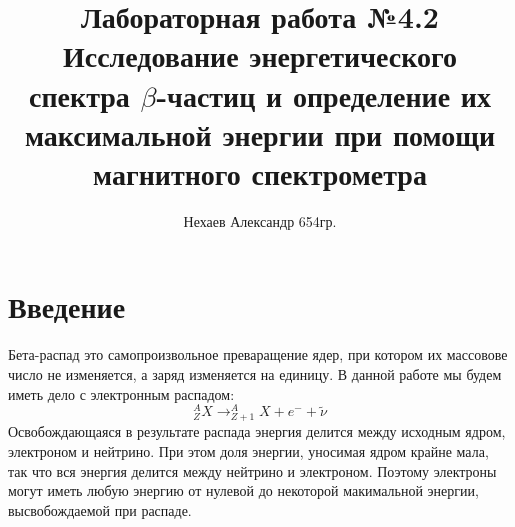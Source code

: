 \documentclass[a4paper, 12pt]{article}
\begin{document}
	\title{Лабораторная работа №4.2\\Исследование энергетического спектра $\beta$-частиц и определение их максимальной энергии при помощи магнитного спектрометра}
	\author{Нехаев Александр 654гр.}
	\maketitle
	\tableofcontents
	\section{Введение}
	Бета-распад это самопроизвольное преваращение ядер, при котором их массовове число не изменяется, а заряд изменяется на единицу. В данной работе мы будем иметь дело с электронным распадом:
		\begin{equation}
		    _{Z}^{A}X \rightarrow _{Z+1}^{A}X + e^{-} + \widetilde{\nu}
		\end{equation}
		Освобождающаяся в результате распада энергия делится между исходным ядром, электроном и нейтрино. При этом доля энергии, уносимая ядром крайне мала, так что вся энергия делится между нейтрино и электроном. Поэтому электроны могут иметь любую энергию от нулевой до некоторой макимальной энергии, высвобождаемой при распаде.
		
\end{document}
